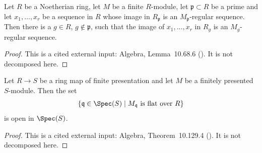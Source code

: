 \begin{lemma}
\label{lem:pc-regular-sequence-spreads-out}
Let $R$ be a Noetherian ring, let $M$ be a finite $R$-module, let
$\mathfrak p\subset R$ be a prime and let $x_1,\dots,x_r$ be a sequence
in $R$ whose image in $R_{\mathfrak p}$ is an $M_{\mathfrak p}$-regular
sequence.  Then there is a $g\in R$, $g\notin\mathfrak p$, such that the
image of $x_1,\dots,x_r$ in $R_g$ is an $M_g$-regular sequence.
\end{lemma}
\begin{proof}
This is a cited external input: Algebra, Lemma~10.68.6
().  It is not decomposed here.
\end{proof}

\begin{lemma}
\label{lem:pc-flat-locus-open}
Let $R\to S$ be a ring map of finite presentation and let $M$ be a
finitely presented $S$-module.  Then the set
\[
\{\mathfrak q\in\Spec(S)\mid M_{\mathfrak q}\text{ is flat over }R\}
\]
is open in $\Spec(S)$.
\end{lemma}
\begin{proof}
This is a cited external input: Algebra, Theorem~10.129.4
().  It is not decomposed here.
\end{proof}

